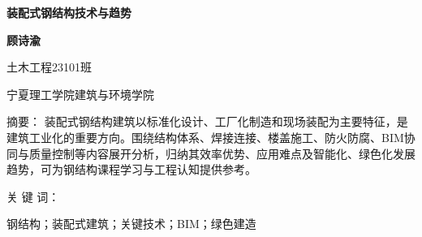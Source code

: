 \documentclass[UTF8,a4paper,10.5pt]{ctexart}
\newenvironment{abstracttext}{\fontsize{9pt}{14pt}\selectfont\songti}{}
\begin{document}
\begin{center}
  {\heiti\bfseries 装配式钢结构技术与趋势\par}
  \vspace{0.8em}
  {\kaishu\bfseries 顾诗渝\par}
  \vspace{0.4em}
  {\songti 土木工程23101班\par}
  \vspace{0.4em}
  {\songti 宁夏理工学院建筑与环境学院\par}
\end{center}

{\heiti 摘\quad 要：}
\begin{abstracttext}
装配式钢结构建筑以标准化设计、工厂化制造和现场装配为主要特征，是建筑工业化的重要方向。围绕结构体系、焊接连接、楼盖施工、防火防腐、BIM协同与质量控制等内容展开分析，归纳其效率优势、应用难点及智能化、绿色化发展趋势，可为钢结构课程学习与工程认知提供参考。
\par
\end{abstracttext}

\vspace{0.4em}
{\heiti 关 键 词：}
{\songti 钢结构；装配式建筑；关键技术；BIM；绿色建造\par}

\vspace{1\baselineskip}
\end{document}
